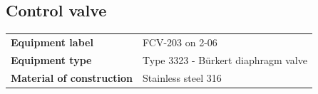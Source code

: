 \newpage
\subsection{Control valve}


\begin{table}[H]
    \centering
    \begin{tabular}{@{}l|l@{}}
    \toprule
      \textbf{Equipment label}  & FCV-203 on 2-06\\
       \textbf{Equipment type}  & Type 3323 - Bürkert diaphragm valve \cite{noauthor_type_nodate}\\
       \textbf{Material of construction} & Stainless steel 316 \\
       \bottomrule
    \end{tabular}
\end{table}

